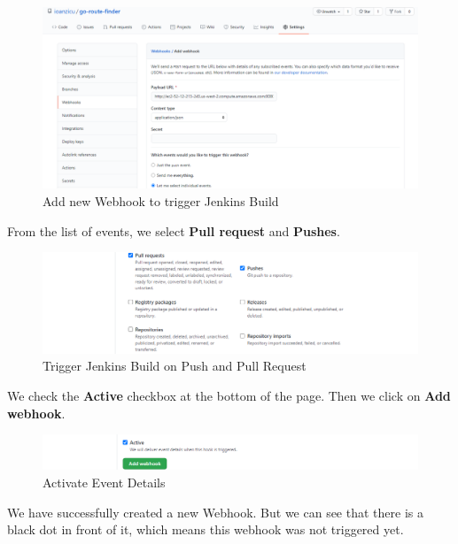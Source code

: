 \documentclass[12pt,a4paper,twoside]{article}
\begin{document}
\begin{figure}[H]
    \centering
        \includegraphics[width=15cm]{images-aws/42-web-hook-setup.png}
        \caption{Add new Webhook to trigger Jenkins Build}
\end{figure}


From the list of events, we select \textbf{Pull request} and \textbf{Pushes}.


\begin{figure}[H]
    \centering
        \includegraphics[width=13cm]{images-aws/43-web-hook-setup-pull.png}
        \caption{Trigger Jenkins Build on Push and Pull Request}
\end{figure}

 We check the \textbf{Active} checkbox at the bottom of the page. Then we click on \textbf{Add webhook}.

\begin{figure}[H]
    \centering
        \includegraphics[width=13cm]{images-aws/44-web-hook-setup-activate.png}
        \caption{Activate Event Details}
\end{figure}


We have successfully created a new Webhook. But we can see that there is a black dot in  front of it, which means this webhook was not triggered yet.
\end{document}
